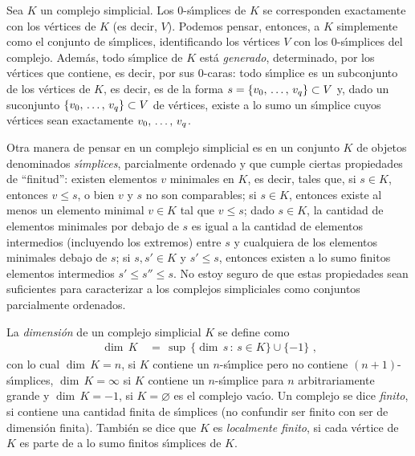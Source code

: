 \begin{obsGeneradoPorVertices}\label{obs:generadoporvertices}
	Sea $K$ un complejo simplicial. Los $0$-s\'{\i}mplices de $K$ se
	corresponden exactamente con los v\'{e}rtices de $K$ (es decir, $V$).
	Podemos pensar, entonces, a $K$ simplemente como el conjunto de
	s\'{\i}mplices, identificando los v\'{e}rtices $V$ con los
	$0$-s\'{\i}mplices del complejo. Adem\'{a}s, todo s\'{\i}mplice de
	$K$ est\'{a} \emph{generado}, determinado, por los v\'{e}rtices que
	contiene, es decir, por sus $0$-caras: todo s\'{\i}mplice es un
	subconjunto de los v\'{e}rtices de $K$, es decir, es de la forma
	$s=\{\lista[0]{v}{q}\}\subset V$ y, dado un suconjunto
	$\{\lista[0]{v}{q}\}\subset V$ de v\'{e}rtices, existe a lo sumo un
	s\'{\i}mplice cuyos v\'{e}rtices sean exactamente $\lista[0]{v}{q}$.

	Otra manera de pensar en un complejo simplicial es en un conjunto
	$K$ de objetos denominados \emph{s\'{\i}mplices}, parcialmente
	ordenado y que cumple ciertas propiedades de ``finitud'':
	existen elementos $v$ minimales en $K$, es decir, tales que,
	si $s\in K$, entonces $v\leq s$, o bien $v$ y $s$ no son comparables;
	si $s\in K$, entonces existe al menos un elemento minimal
	$v\in K$ tal que $v\leq s$; dado $s\in K$, la cantidad de elementos
	minimales por debajo de $s$ es igual a la cantidad de elementos
	intermedios (incluyendo los extremos) entre $s$ y cualquiera
	de los elementos minimales debajo de $s$; si $s,s'\in K$ y $s'\leq s$,
	entonces existen a lo sumo finitos elementos intermedios
	$s'\leq s''\leq s$. No estoy seguro de que estas propiedades sean
	suficientes para caracterizar a los complejos simpliciales como
	conjuntos parcialmente ordenados.
\end{obsGeneradoPorVertices}

La \emph{dimensi\'{o}n} de un complejo simplicial $K$ se define como
\begin{align*}
	\dim\,K & \,=\,\sup\,\{\dim\,s\,:\,s\in K\}\cup\{-1\}
	\text{ ,}
\end{align*}
%
con lo cual $\dim\,K=n$, si $K$ contiene un $n$-s\'{\i}mplice pero no
contiene $(n+1)$-s\'{\i}mplices, $\dim\,K=\infty$ si $K$ contiene un
$n$-s\'{\i}mplice para $n$ arbitrariamente grande y $\dim\,K=-1$, si
$K=\varnothing$ es el complejo vac\'{\i}o. Un complejo se dice
\emph{finito}, si contiene una cantidad finita de s\'{\i}mplices
(no confundir ser finito con ser de dimensi\'{o}n finita). Tambi\'{e}n se
dice que $K$ es \emph{localmente finito}, si cada v\'{e}rtice de $K$
es parte de a lo sumo finitos s\'{\i}mplices de $K$.

